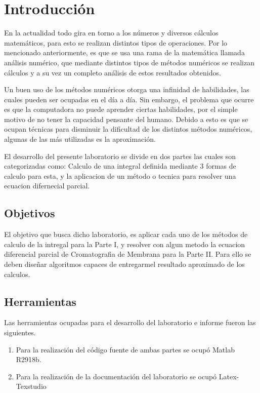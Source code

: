 \section{Introducción}

\par En la actualidad todo gira en torno a los números y diversos cálculos matemáticos, para esto se realizan distintos tipos de operaciones. Por lo mencionado anteriormente, es que se usa una rama de la matemática llamada análisis numérico, que mediante distintos tipos de métodos numéricos se realizan cálculos y a su vez un completo análisis de estos resultados obtenidos.

\par Un buen uso de los métodos numéricos otorga una infinidad de habilidades, las cuales pueden ser ocupadas en el día a día. Sin embargo, el problema que ocurre es que la computadora no puede aprender ciertas habilidades, por el simple motivo de no tener la capacidad pensante del humano. Debido a esto es que se ocupan técnicas para disminuir la dificultad de los distintos métodos numéricos, algunas  de las más utilizadas es la aproximación.

\par El desarrollo del presente laboratorio se divide en dos partes las cuales son categorizadas como: Calculo de una integral definida mediante 3 formas de calculo para esta, y la aplicacion de un método o tecnica para resolver una ecuacion difernecial parcial.

\subsection{Objetivos}

\par El objetivo que busca dicho laboratorio, es aplicar cada uno de los métodos de calculo de la intregal para la Parte I, y resolver con algun metodo la ecuacion diferencial parcial de Cromatografia de Membrana para la Parte II. Para ello se deben diseñar algoritmos capaces de entregarmel resultado aproximado de los calculos.

\subsection{Herramientas}

\par Las herramientas ocupadas para el desarrollo del laboratorio e informe fueron las siguientes.

\begin{enumerate}
	\item Para la realización del código fuente de ambas partes se ocupó Matlab R2918b.
	\item  Para la realización de la documentación del laboratorio se ocupó Latex-Texstudio 
\end{enumerate}



 